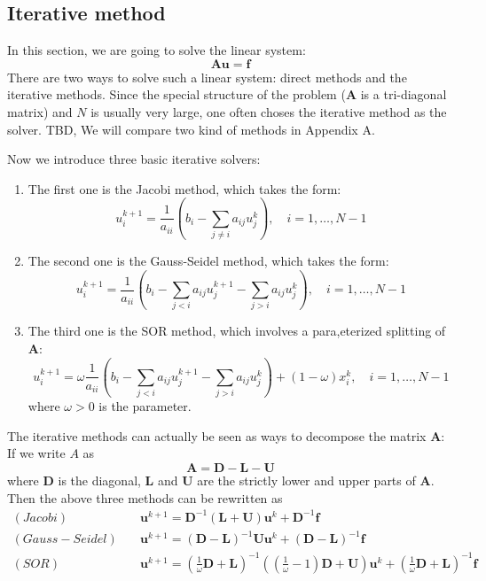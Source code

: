 \documentclass[onecolumn, conference]{IEEEtran}
\begin{document}
\subsection{Iterative method}
In this section, we are going to solve the linear system:
\begin{equation}
    \label{eq:linear_system}
    \mathbf{A}\mathbf{u}=\mathbf{f}
\end{equation}
There are two ways to solve such a linear system: direct methods and the iterative methods. Since the special structure of the problem ($\mathbf{A}$ is a tri-diagonal matrix) and $N$ is usually very large, one often choses the iterative method as the solver. {\color{blue} TBD, We will compare two kind of methods in Appendix A}.

Now we introduce three basic iterative solvers:
\begin{enumerate}
    \item The first one is the Jacobi method, which takes the form:
    \begin{equation}
        u^{k+1}_i=\frac{1}{a_{ii}}\left(b_i-\sum_{j\neq i}a_{ij}u^{k}_j\right),\quad i=1,\dots,N-1
    \end{equation}
    \item The second one is the Gauss-Seidel method, which takes the form:
    \begin{equation}
        u^{k+1}_i=\frac{1}{a_{ii}}\left(b_i-\sum_{j< i}a_{ij}u^{k+1}_j-\sum_{j> i}a_{ij}u^{k}_j\right),\quad i=1,\dots,N-1
    \end{equation}
    \item The third one is the SOR method, which involves a para,eterized splitting of $\mathbf{A}$:
    \begin{equation}
        u_i^{k+1}=\omega\frac{1}{a_{ii}}\left(b_i-\sum_{j< i}a_{ij}u^{k+1}_j-\sum_{j> i}a_{ij}u^{k}_j\right)+(1-\omega)x_i^{k},\quad i=1,\dots,N-1
    \end{equation} 
    where $\omega>0$ is the parameter.
\end{enumerate}
The iterative methods can actually be seen as ways to decompose the matrix $\mathbf{A}$: If we write $A$ as 
\begin{equation*}
    \mathbf{A}=\mathbf{D}-\mathbf{L}-\mathbf{U}
\end{equation*}
where $\mathbf{D}$ is the diagonal, $\mathbf{L}$ and $\mathbf{U}$ are the strictly lower and upper parts of $\mathbf{A}$. Then the above three methods can be rewritten as 
\begin{align}
    (Jacobi)&\quad \mathbf{u}^{k+1}=\mathbf{D}^{-1}\left(\mathbf{L}+\mathbf{U}\right)\mathbf{u}^{k}+\mathbf{D}^{-1}\mathbf{f}\\
    (Gauss-Seidel)&\quad \mathbf{u}^{k+1}=\left(\mathbf{D}-\mathbf{L}\right)^{-1}\mathbf{U}\mathbf{u}^{k}+\left(\mathbf{D}-\mathbf{L}\right)^{-1}\mathbf{f}\\
    (SOR)&\quad \mathbf{u}^{k+1}=\left(\frac{1}{\omega}\mathbf{D}+\mathbf{L}\right)^{-1}\left(\left(\frac{1}{\omega}-1\right)\mathbf{D}+\mathbf{U}\right)\mathbf{u}^{k}+\left(\frac{1}{\omega}\mathbf{D}+\mathbf{L}\right)^{-1}\mathbf{f}
\end{align}
\end{document}
